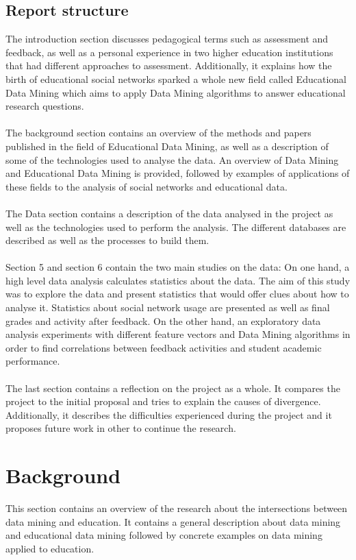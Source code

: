 \documentclass[11pt, oneside]{article}   	%
\begin{document}
\subsection{Report structure}
The introduction section discusses pedagogical terms such as assessment and feedback, as well as a personal experience in two higher education institutions that had different approaches to assessment. Additionally, it explains how the birth of educational social networks sparked a whole new field called Educational Data Mining which aims to apply Data Mining algorithms to answer educational research questions.\\\\
The background section contains an overview of the methods and papers published in the field of Educational Data Mining, as well as a description of some of the technologies used to analyse the data. An overview of Data Mining and Educational Data Mining is provided, followed by examples of applications of these fields to the analysis of social networks and educational data.\\\\
The Data section contains a description of the data analysed in the project as well as the technologies used to perform the analysis. The different databases are described as well as the processes to build them.\\\\
Section 5 and section 6 contain the two main studies on the data: On one hand, a high level data analysis calculates statistics about the data. The aim of this study was to explore the data and present statistics that would offer clues about how to analyse it. Statistics about social network usage are presented as well as final grades and activity after feedback. On the other hand, an exploratory data analysis experiments with different feature vectors and Data Mining algorithms in order to find correlations between feedback activities and student academic performance.\\\\
The last section contains a reflection on the project as a whole. It compares the project to the initial proposal and tries to explain the causes of divergence. Additionally, it describes the difficulties experienced during the project and it proposes future work in other to continue the research.

\section{Background} 
This section contains an overview of the research about the intersections between data mining and education. It contains a general description about data mining and educational data mining followed by concrete examples on data mining applied to education.
\end{document}
